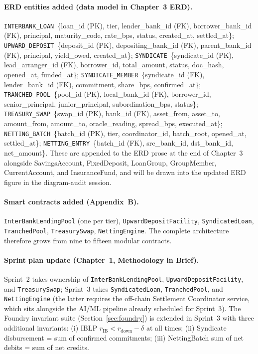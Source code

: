 \documentclass[12pt,a4paper]{report}
\begin{document}
\paragraph{ERD entities added (data model in Chapter~3 ERD).}
\texttt{INTERBANK\_LOAN}~\{loan\_id (PK), tier, lender\_bank\_id (FK), borrower\_bank\_id (FK), principal, maturity\_code, rate\_bps, status, created\_at, settled\_at\}; \texttt{UPWARD\_DEPOSIT}~\{deposit\_id (PK), depositing\_bank\_id (FK), parent\_bank\_id (FK), principal, yield\_owed, created\_at\}; \texttt{SYNDICATE}~\{syndicate\_id (PK), lead\_arranger\_id (FK), borrower\_id, total\_amount, status, doc\_hash, opened\_at, funded\_at\}; \texttt{SYNDICATE\_MEMBER}~\{syndicate\_id (FK), lender\_bank\_id (FK), commitment, share\_bps, confirmed\_at\}; \texttt{TRANCHED\_POOL}~\{pool\_id (PK), local\_bank\_id (FK), borrower\_id, senior\_principal, junior\_principal, subordination\_bps, status\}; \texttt{TREASURY\_SWAP}~\{swap\_id (PK), bank\_id (FK), asset\_from, asset\_to, amount\_from, amount\_to, oracle\_reading, spread\_bps, executed\_at\}; \texttt{NETTING\_BATCH}~\{batch\_id (PK), tier, coordinator\_id, batch\_root, opened\_at, settled\_at\}; \texttt{NETTING\_ENTRY}~\{batch\_id (FK), src\_bank\_id, dst\_bank\_id, net\_amount\}. These are appended to the ERD prose at the end of Chapter~3 alongside SavingsAccount, FixedDeposit, LoanGroup, GroupMember, CurrentAccount, and InsuranceFund, and will be drawn into the updated ERD figure in the diagram-audit session.

\paragraph{Smart contracts added (Appendix~B).}
\texttt{InterBankLendingPool} (one per tier), \texttt{UpwardDepositFacility}, \texttt{SyndicatedLoan}, \texttt{TranchedPool}, \texttt{TreasurySwap}, \texttt{NettingEngine}. The complete architecture therefore grows from nine to fifteen modular contracts.

\paragraph{Sprint plan update (Chapter~1, Methodology in Brief).}
Sprint~2 takes ownership of \texttt{InterBankLendingPool}, \texttt{UpwardDepositFacility}, and \texttt{TreasurySwap}; Sprint~3 takes \texttt{SyndicatedLoan}, \texttt{TranchedPool}, and \texttt{NettingEngine} (the latter requires the off-chain Settlement Coordinator service, which sits alongside the AI/ML pipeline already scheduled for Sprint~3). The Foundry invariant suite (Section~\ref{sec:foundry}) is extended in Sprint~3 with three additional invariants: (i) IBLP $r_{\text{IB}} < r_{\text{down}} - \delta$ at all times; (ii) Syndicate disbursement = sum of confirmed commitments; (iii) NettingBatch sum of net debits = sum of net credits.
\end{document}
